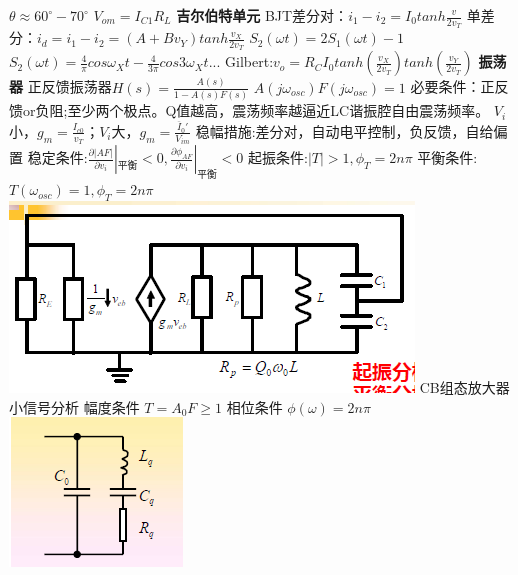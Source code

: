\documentclass[10.5pt,landscape]{article}
\begin{document}
\begin{multicols*}{4}
$ \theta \approx 60^{\circ}  -  70^{\circ} $\newline
$ V_{om} = I_{C1}R_L $ \newline
\textbf{吉尔伯特单元} \newline
BJT差分对：$ i_1 - i_2 = I_0 tanh\frac{v}{2v_T} $ \newline
单差分：$ i_d = i_1 - i_2 = (A + Bv_Y) tanh\frac{v_X}{2v_T} $\newline
$S_2(\omega t) = 2S_1(\omega t) - 1$\newline
$S_2(\omega t)  =  \frac{4}{\pi}cos\omega_Xt - \frac{4}{3\pi} cos 3\omega_Xt ...$ \newline
Gilbert:$ v_o = R_C I_0 tanh(\frac{v_X}{2v_T})tanh(\frac{v_Y}{2v_T}) $ \newline
\textbf{ 振荡器}
\newline
正反馈振荡器$H(s) = \frac{A(s)}{1 - A(s)F(s)}$ $A(j\omega_{osc})F(j\omega_{osc})=1$ \newline
必要条件：正反馈or负阻;至少两个极点。Q值越高，震荡频率越逼近LC谐振腔自由震荡频率。\newline
$V_i$小，$g_m = \frac{I_{c0}}{v_T}$；$V_i$大，$g_m = \frac{\overline{I}_0'}{V_{im}}$ \newline
稳幅措施:差分对，自动电平控制，负反馈，自给偏置\newline
稳定条件:$\frac{\partial|AF|}{\partial v_i}|_{平衡} < 0, \frac{\partial \phi_{AF}}{\partial v_i}|_{平衡} < 0$ \newline
起振条件:$|T| >1, \phi_T = 2n\pi$ 
平衡条件:$T(\omega_{osc}) = 1, \phi_T = 2n\pi$ \newline
\includegraphics[scale=0.7]{CB}\newline
CB组态放大器小信号分析\newline
幅度条件 $ T = A_0 F \geq 1 $\newline
相位条件 $ \phi(\omega ) = 2n\pi $\newline
\includegraphics[scale=0.6]{crystal}\newline

\end{multicols*}
\end{document}
